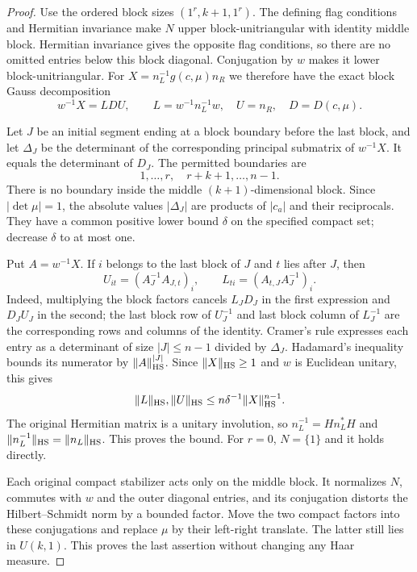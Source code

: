 \begin{proof}
Use the ordered block sizes $(1^r,k+1,1^r)$.
The defining flag conditions and Hermitian invariance make $N$
upper block-unitriangular with identity middle block.
Hermitian invariance gives the opposite flag conditions, so there
are no omitted entries below this block diagonal.
Conjugation by $w$ makes it lower block-unitriangular.
For $X=n_L^{-1}g(c,\mu)n_R$ we therefore have the exact
block Gauss decomposition
\[
             w^{-1}X=LDU,\qquad
 L=w^{-1}n_L^{-1}w,\quad U=n_R,\quad D=D(c,\mu).
\]

Let $J$ be an initial segment ending at a block boundary before
the last block, and let $\Delta_J$ be the determinant of the
corresponding principal submatrix of $w^{-1}X$.
It equals the determinant of $D_J$.
The permitted boundaries are
\[
                1,\ldots,r,\quad r+k+1,\ldots,n-1 .
\]
There is no boundary inside the middle $(k+1)$-dimensional block.
Since $|\det\mu|=1$, the absolute values $|\Delta_J|$
are products of $|c_a|$ and their reciprocals.
They have a common positive lower bound $\delta$ on the specified
compact set; decrease $\delta$ to at most one.

Put $A=w^{-1}X$. If $i$ belongs to the last block of $J$ and
$t$ lies after $J$, then
\[
 U_{it}=(A_J^{-1}A_{J,t})_i,\qquad
 L_{ti}=(A_{t,J}A_J^{-1})_i .
\]
Indeed, multiplying the block factors cancels $L_JD_J$ in the
first expression and $D_JU_J$ in the second; the last block row
of $U_J^{-1}$ and last block column of $L_J^{-1}$ are the
corresponding rows and columns of the identity.
Cramer's rule expresses each entry as a determinant of size
$|J|\le n-1$ divided by $\Delta_J$.
Hadamard's inequality bounds its numerator by
$\|A\|_{\rm HS}^{|J|}$.
Since $\|X\|_{\rm HS}\ge1$ and $w$ is Euclidean unitary, this gives
\[
 \|L\|_{\rm HS},\|U\|_{\rm HS}
       \le n\delta^{-1}\|X\|_{\rm HS}^{n-1}.
\]
The original Hermitian matrix is a unitary involution, so
$n_L^{-1}=Hn_L^*H$ and
$\|n_L^{-1}\|_{\rm HS}=\|n_L\|_{\rm HS}$.
This proves the bound. For $r=0$, $N=\{1\}$ and it holds directly.

Each original compact stabilizer acts only on the middle block.
It normalizes $N$, commutes with $w$ and the outer diagonal
entries, and its conjugation distorts the Hilbert--Schmidt norm
by a bounded factor. Move the two compact factors into these
conjugations and replace $\mu$ by their left-right translate.
The latter still lies in $U(k,1)$. This proves the last assertion
without changing any Haar measure.
\end{proof}

